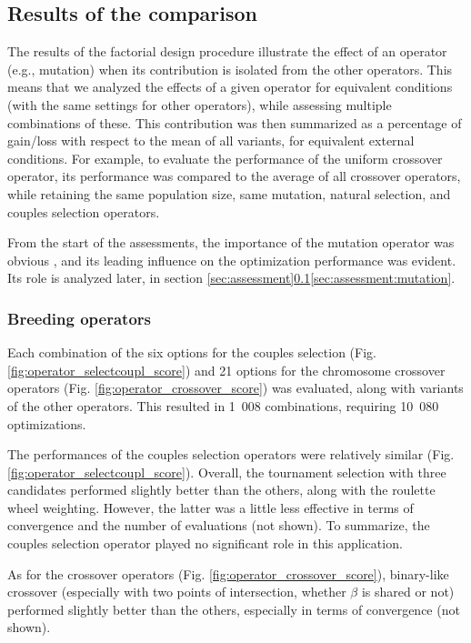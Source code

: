 \documentclass{ametsoc}
\begin{document}
\subsection{Results of the comparison}
\label{sec:assessment:results}

The results of the factorial design procedure illustrate the effect of an operator (e.g., mutation) when its contribution is isolated from the other operators. This means that we analyzed the effects of a given operator for equivalent conditions (with the same settings for other operators), while assessing multiple combinations of these. This contribution was then summarized as a percentage of gain/loss with respect to the mean of all variants, for equivalent external conditions. For example, to evaluate the performance of the uniform crossover operator, its performance was compared to the average of all crossover operators, while retaining the same population size, same mutation, natural selection, and couples selection operators.

From the start of the assessments, the importance of the mutation operator was obvious \cite[see][for details]{Horton2012a}, and its leading influence on the optimization performance was evident. Its role is analyzed later, in section \ref{sec:assessment}\ref{sec:assessment:results}\ref{sec:assessment:mutation}.

\subsubsection{Breeding operators}

Each combination of the six options for the couples selection (Fig. \ref{fig:operator_selectcoupl_score}) and 21 options for the chromosome crossover operators (Fig. \ref{fig:operator_crossover_score}) was evaluated, along with variants of the other operators. This resulted in 1~008 combinations, requiring 10~080 optimizations.

The performances of the couples selection operators were relatively similar (Fig. \ref{fig:operator_selectcoupl_score}). Overall, the tournament selection with three candidates performed slightly better than the others, along with the roulette wheel weighting. However, the latter was a little less effective in terms of convergence and the number of evaluations (not shown). To summarize, the couples selection operator played no significant role in this application. 

As for the crossover operators (Fig. \ref{fig:operator_crossover_score}), binary-like crossover (especially with two points of intersection, whether $\beta$ is shared or not) performed slightly better than the others, especially in terms of convergence (not shown).
\end{document}
